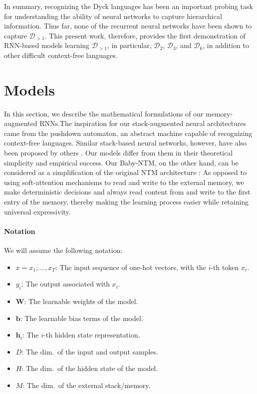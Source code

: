 \documentclass[11pt,a4paper]{article}
\theoremstyle{plain}
\newcommand{\dyck}[1]{\ensuremath{\mathcal{D}_{#1}}}
\newcommand{\gendyck}{\dyck{>1}}
\begin{document}
In summary, recognizing the Dyck languages has been an important probing task for understanding the ability of neural networks to capture hierarchical information. Thus far, none of the recurrent neural networks have been shown to capture \gendyck. This present work, therefore, provides the first demonstration of RNN-based models learning \gendyck, in particular, \dyck{2}, \dyck{3}, and \dyck{6}, in addition to other difficult context-free languages.

\section{Models}
In this section, we describe the mathematical formulations of our memory-augmented RNNs.The inspiration for our stack-augmented neural architectures came from the pushdown automaton, an abstract machine capable of recognizing context-free languages. Similar stack-based neural networks, however, have also been proposed by others \cite{pollack1991induction, das1992learning, joulin2015inferring, grefenstette2015learning}. Our models differ from them in their theoretical simplicity and empirical success. Our Baby-NTM, on the other hand, can be considered as a simplification of the original NTM architecture \citep{graves2014neural}: As opposed to using soft-attention mechanisms to read and write to the external memory, we make deterministic decisions and always read content from and write to the first entry of the memory, thereby making the learning process easier while retaining universal expressivity.

\vspace{-0.2em}
\paragraph{Notation} We will assume the following notation: 
\begin{itemize}[topsep=\parskip]
\setlength\itemsep{-0.15em}
\item $x = x_1,...,x_T$: The input sequence of one-hot vectors, with the $i$-th token $x_i$.
\item $y_i$: The output associated with $x_i$.
\item $\mathbf{W}$: The learnable weights of the model.
\item $\mathbf{b}$: The learnable bias terms of the model.
\item $\mathbf{h}_i$: The $i$-th hidden state representation.
\item $D$: The dim.\ of the input and output samples.
\item $H$: The dim.\ of the hidden state of the model.
\item $M$: The dim.\ of the external stack/memory.
\end{itemize}
\end{document}
